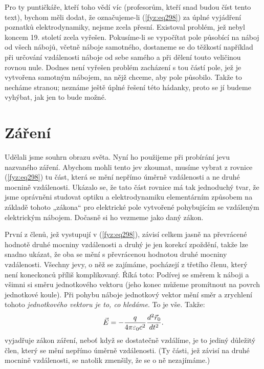     Pro ty puntičkáře, kteří toho vědí víc (profesorům, kteří snad budou číst tento text), bychom 
    měli dodat, že označujeme-li (\ref{fyz:eq298}) za úplné vyjádření poznatků elektrodynamiky, 
    nejsme zcela přesní. Existoval problém, jež nebyl koncem 19. století zcela vyřešen. Pokusíme-li 
    se vypočítat pole působící na náboj od všech nábojů, včetně náboje samotného, dostaneme se do 
    těžkostí například při určování vzdálenosti náboje od sebe samého a při dělení touto veličinou 
    rovnou nule. Dodnes není vyřešen problém zacházení s tou částí pole, jež je vytvořena samotným 
    nábojem, na nějž chceme, aby pole působilo. Takže to necháme stranou; neznáme ještě úplné 
    řešení této hádanky, proto se jí budeme vyhýbat, jak jen to bude možné.
    
  \section{Záření}\label{fyz:IchapXXVIIIsecII}
    Udělali jsme souhrn obrazu světa. Nyní ho použijeme při probírání jevu nazvaného záření. 
    Abychom mohli tento jev zkoumat, musíme vybrat z rovnice (\ref{fyz:eq298}) tu část, která se 
    mění nepřímo úměrně vzdálenosti a ne druhé mocnině vzdálenosti. Ukázalo se, že tato část 
    rovnice má tak jednoduchý tvar, že jsme oprávněni studovat optiku a elektrodynamiku 
    elementárním způsobem na základě tohoto „zákona“ pro elektrické pole vytvořené pohybujícím se 
    vzdáleným elektrickým nábojem. Dočasně si ho vezmeme jako daný zákon.
   
    První z členů, jež vystupují v (\ref{fyz:eq298}), závisí celkem jasně na převrácené hodnotě 
    druhé mocniny vzdálenosti a druhý je jen korekcí zpoždění, takže lze snadno ukázat, že oba se 
    mění s převrácenou hodnotou druhé mocniny vzdálenosti. Všechny jevy, o něž se zajímáme, 
    pocházejí z třetího členu, který není koneckonců příliš komplikovaný. Říká toto: Podívej se 
    směrem k náboji a všimni si směru jednotkového vektoru (jeho konec můžeme promítnout na povrch 
    jednotkové koule). Při pohybu náboje jednotkový vektor mění směr a zrychlení tohoto 
    \emph{jednotkového vektoru je to, co hledáme}. To je vše. Takže:
    \begin{equation}\label{fyz:eq300}
      \vec{E} = -\frac{q}{4\pi\varepsilon_0c^2}\dfrac{d^2 \vec{r}_0}{d t^2}.
    \end{equation}
    vyjadřuje zákon záření, neboť když se dostatečně vzdálíme, je to jediný důležitý člen, který se 
    mění nepřímo úměrně vzdálenosti. (Ty části, jež závisí na druhé mocnině vzdálenosti, se natolik 
    zmenšily, že se o ně nezajímáme.) 
    
